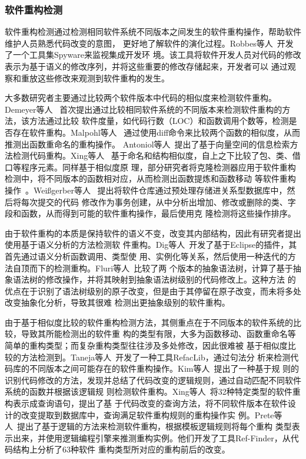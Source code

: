 \subsubsection{软件重构检测}
软件重构检测通过检测相同软件系统不同版本之间发生的软件重构操作，帮助软件维护人员熟悉代码改变的意图，
更好地了解软件的演化过程。Robbes等人~\cite{robbes2008spyware}开发了一个工具集Spyware来监视集成开发环
境。该工具将软件开发人员对代码的修改表示为基于语义的修改序列，并将这些重要的修改存储起来，开发者可以
通过观察和重放这些修改来观测到软件重构的发生。

大多数研究者主要通过比较两个软件版本中代码的相似度来检测软件重构。Demeyer等人
~\cite{demeyer2000finding}首次提出通过比较相同软件系统的不同版本来检测软件重构的方法，该方法通过比较
软件度量，如代码行数（LOC）和函数调用个数等，检测是否存在软件重构。Malpohl等人
~\cite{malpohl2003renaming}通过使用diff命令来比较两个函数的相似度，从而推测出函数重命名的重构操作。
Antoniol等人~\cite{antoniol2004automatic}提出了基于向量空间的信息检索方法检测代码重构。Xing等人
~\cite{xing2005umldiff}基于命名和结构相似度，自上之下比较了包、类、借口等程序元素。同样基于相似度原
理，部分研究者将克隆检测器应用于软件重构检测中，将不同版本的函数相对应，从而检测出函数提炼和函数移动
等软件重构操作~\cite{van2003reconstruction,kim2005functions}。Weißgerber等人
~\cite{weissgerber2006identifying}提出将软件仓库通过预处理存储进关系型数据库中，然后将每次提交的代码
修改作为事务创建，从中分析出增加、修改或删除的类、字段和函数，从而得到可能的软件重构操作，最后使用克
隆检测将这些操作排序。

由于软件重构的本质是保持软件的语义不变，改变其内部结构，因此有研究者提出使用基于语义分析的方法检测软
件重构。Dig等人~\cite{dig2006automated}开发了基于Eclipse的插件，其首先通过语义分析函数调用、类型使
用、实例化等关系，然后使用一种迭代的方法自顶而下的检测重构。Fluri等人~\cite{fluri2007change}比较了两
个版本的抽象语法树，计算了基于抽象语法树的修改操作，并将其映射到抽象语法树级别的代码修改上。这种方法
的优点在于识别了语法树级别的原子改变，但是由于其停留在原子改变，而未将多处改变抽象化分析，导致其很难
检测出更抽象级别的软件重构。

由于基于相似度比较的软件重构检测方法，其侧重点在于不同版本的软件系统的比较，导致其所能检测出的软件重
构的类型有限，大多为函数移动、函数重命名等简单的重构类型；而复杂重构类型往往涉及多处修改，因此很难被
基于相似度比较的方法检测到。Taneja等人~\cite{taneja2007automated}开发了一种工具RefacLib，通过句法分
析来检测代码库的不同版本之间可能存在的软件重构操作。Kim等人~\cite{kim2007automatic}提出了一种基于规
则的识别代码修改的方法，发现并总结了代码改变的逻辑规则，通过自动匹配不同软件系统的函数并根据该逻辑规
则检测软件重构。Xing等人~\cite{xing2006refactoring}将32种特定类型的软件重构表示成查询语句，提出了基
于代码改变的查询方法，将不同软件版本在软件设计的改变提取到数据库中，查询满足软件重构规则的重构操作实
例。Prete等人~\cite{prete2010template}提出了基于逻辑的方法来检测软件重构，根据模板逻辑规则将每个重构
类型表示出来，并使用逻辑编程引擎来推测重构实例。他们开发了工具Ref-Finder，从代码结构上分析了63种软件
重构类型所对应的重构前后的改变。


